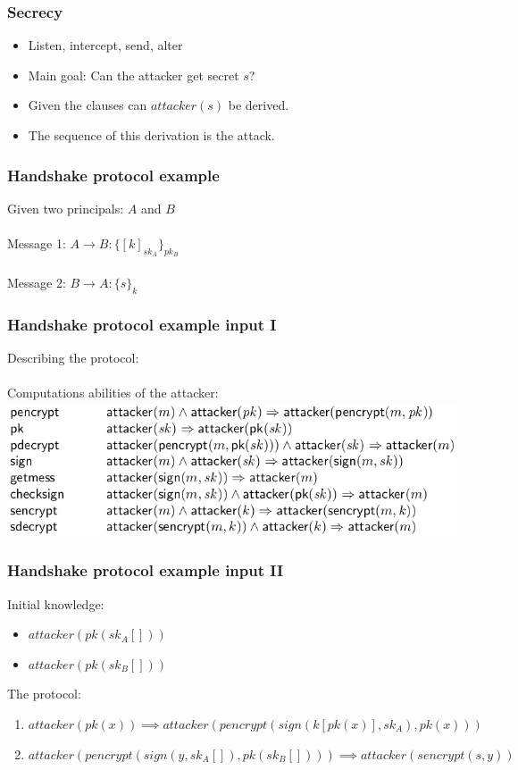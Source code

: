 \documentclass[10pt]{beamer}
\begin{document}
\begin{frame}
  \frametitle{Secrecy}
  \begin{itemize}
  \item Listen, intercept, send, alter
  \item Main goal: Can the attacker get secret $s$?
  \item Given the clauses can $attacker(s)$ be derived.
  \item The sequence of this derivation is the attack.
  \end{itemize}
\end{frame}


\begin{frame}
  \frametitle{Handshake protocol example}
  Given two principals: $A$ and $B$
  \\~\\
  Message 1: $A \rightarrow B : \{[k]_{sk_{A}}\}_{pk_{B}}$
  \\~\\
  Message 2: $B \rightarrow A : \{s\}_{k}$
\end{frame}

\begin{frame}
  \frametitle{Handshake protocol example input I}
  Describing the protocol:
  \\~\\
  Computations abilities of the attacker:
  \includegraphics[width=.9\textwidth]{graphics/abilities.png}
  
\end{frame}

\begin{frame}
  \frametitle{Handshake protocol example input II}
  Initial knowledge:
  \begin{itemize}
  \item $attacker(pk(sk_A[]))$
  \item $ attacker(pk(sk_B[]))$
  \end{itemize}
  The protocol:
  \begin{enumerate}
  \item $attacker(pk(x)) \implies attacker(pencrypt(sign(k[pk(x)],sk_A),pk(x)))$
  \item $attacker(pencrypt(sign(y,sk_A[]),pk(sk_B[]))) \implies attacker(sencrypt(s,y))$
  \end{enumerate}
\end{frame}
\end{document}
